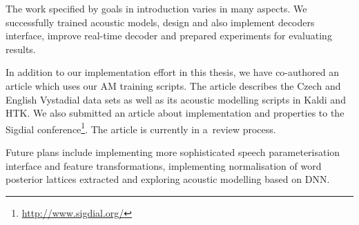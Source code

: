 % 
% 
% 

The work specified by goals in introduction varies in many aspects. 
We successfully trained acoustic models, design and also implement decoders interface, improve real-time decoder and prepared experiments for evaluating results.

In addition to our implementation effort in this thesis, we have co-authored an article which uses our \ac{AM} training scripts.
The article\cite{korvas_2014} describes the Czech and English Vystadial data sets as well as its acoustic modelling scripts in Kaldi and \ac{HTK}.
We also submitted an article about  implementation and properties to the Sigdial conference\footnote{\url{http://www.sigdial.org/}}. The article is currently in a~review process.

Future plans include implementing more sophisticated speech parameterisation interface and feature transformations, implementing normalisation of word posterior lattices extracted and exploring acoustic modelling based on \acl{DNN}.

